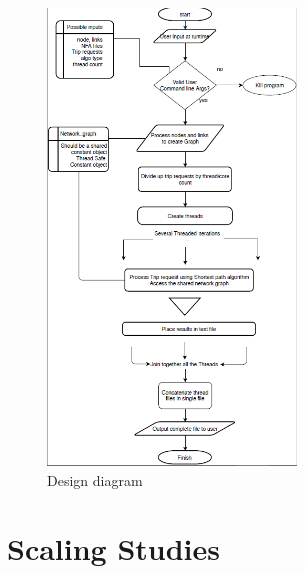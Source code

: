 \documentclass[English]{article}
\theoremstyle{remark}
\numberwithin{equation}{section}
\begin{document}
\begin{figure}[H]
    \centering
    \includegraphics[width=250]{design.png}
    \caption{Design diagram}
    \label{fig:design1}
\end{figure}

\section{Scaling Studies}
\label{sec:scalingstudies}
\end{document}
